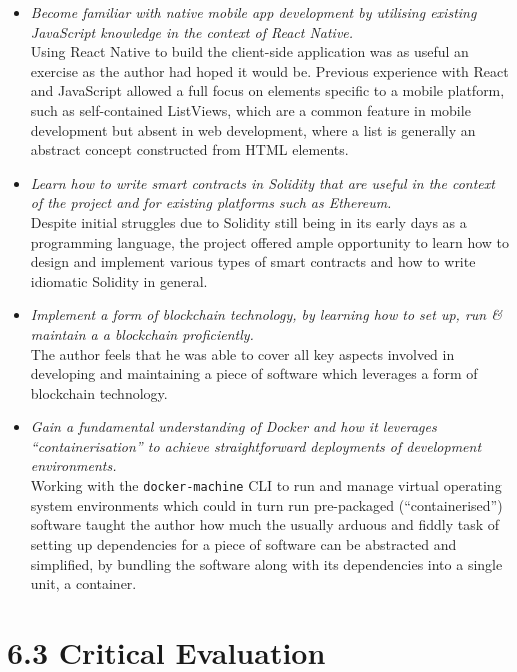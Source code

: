 \documentclass[12pt]{report}
\begin{document}
\begin{itemize}
\item
  \emph{Become familiar with native mobile app development by utilising
  existing JavaScript knowledge in the context of React Native.}\\
  Using React Native to build the client-side application was as useful
  an exercise as the author had hoped it would be. Previous experience
  with React and JavaScript allowed a full focus on elements specific to
  a mobile platform, such as self-contained ListViews, which are a
  common feature in mobile development but absent in web development,
  where a list is generally an abstract concept constructed from HTML
  elements.
\item
  \emph{Learn how to write smart contracts in Solidity that are useful
  in the context of the project and for existing platforms such as
  Ethereum.}\\
  Despite initial struggles due to Solidity still being in its early
  days as a programming language, the project offered ample opportunity
  to learn how to design and implement various types of smart contracts
  and how to write idiomatic Solidity in general.
\item
  \emph{Implement a form of blockchain technology, by learning how to
  set up, run \& maintain a a blockchain proficiently.}\\
  The author feels that he was able to cover all key aspects involved in
  developing and maintaining a piece of software which leverages a form
  of blockchain technology.
\item
  \emph{Gain a fundamental understanding of Docker and how it leverages
  ``containerisation'' to achieve straightforward deployments of
  development environments.}\\
  Working with the \texttt{docker-machine} CLI to run and manage virtual
  operating system environments which could in turn run pre-packaged
  (``containerised'') software taught the author how much the usually
  arduous and fiddly task of setting up dependencies for a piece of
  software can be abstracted and simplified, by bundling the software
  along with its dependencies into a single unit, a container.
\end{itemize}

\section{6.3 Critical Evaluation}\label{critical-evaluation}
\end{document}
